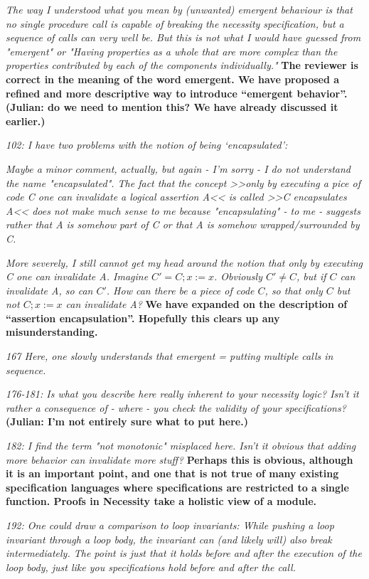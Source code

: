 \documentclass[11pt]{amsart}
\newcommand{\rev}[1]{\emph #1}
\newcommand{\us}[1]{\bf #1}
\begin{document}
{\rev {{    The way I understood what you mean by (unwanted) emergent behaviour is that no single procedure call is capable of breaking the necessity specification, but a sequence of calls can very well be. But this is not what I would have guessed from "emergent" or "Having properties as a whole that are more complex than the properties contributed by each of the components individually." }}}
{\us{The reviewer is correct in the meaning of the word emergent. We have proposed a refined and more descriptive way to introduce ``emergent behavior''. 
(Julian: do we need to mention this? We have already discussed it earlier.)}}

{\rev {{102: I have two problems with the notion of being  `encapsulated': }}}

{\rev {{ Maybe a minor comment, actually, but again - I'm sorry - I do not understand the name "encapsulated". The fact that the concept >>only by executing a pice of code C one can invalidate a logical assertion A<< is called >>C encapsulates A<< does not make much sense to me because "encapsulating" - to me - suggests rather that A is somehow part of C or that A is somehow wrapped/surrounded by C. }}}

{\rev {{ More severely, I still cannot get my head around the notion that only by executing C one can invalidate A. Imagine $C' = C; x:=x$. Obviously $C' \neq C$, but if $C$ can invalidate A, so can $C'$. How can there be a piece of code $C$, so that only $C$ but not $C; x:=x$ can invalidate A? }}}
{\us{We have expanded on the description of ``assertion encapsulation''. Hopefully this clears up any misunderstanding.}}

{\rev {{167 Here, one slowly understands that emergent = putting multiple calls in sequence. }}}

{\rev {{176-181: Is what you describe here really inherent to your necessity logic? Isn't it rather a consequence of - where - you check the validity of your specifications? }}}
{\us{{(Julian: I'm not entirely sure what to put here.)}}}

{\rev {{182: I find the term "not monotonic" misplaced here. Isn't it obvious that adding more behavior can invalidate more stuff? }}}
{\us{Perhaps this is obvious, although it is an important point, and one that is not true of many existing specification languages where specifications are restricted to a single 
function. Proofs in Necessity take a holistic view of a module.}}

{\rev {{192: One could draw a comparison to loop invariants: While pushing a loop invariant through a loop body, the invariant can (and likely will) also break intermediately. The point is just that it holds before and after the execution of the loop body, just like you specifications hold before and after the call. }}}
\end{document}
